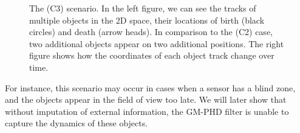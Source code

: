 \begin{figure}
\begin{subfigure}[]{0.48\linewidth}
\begin{subfigure}[b]{\linewidth}
        \end{subfigure}
    \end{subfigure}
  \caption[True tracks of objects in the (C3) and (C4) scenarios.]{The (C3) scenario. In the left figure, we can see the tracks of multiple objects in the 2D space, their locations of birth (black circles) and death (arrow heads). In comparison to the (C2) case, two additional objects appear on two additional positions. The right figure shows how the coordinates of each object track change over time.}
  \label{fig:c3-scenario}
\end{figure}

For instance, this scenario may occur in cases when a sensor has a blind zone, and the objects appear in the field of view too late. We will later show that without imputation of external information, the GM-PHD filter is unable to capture the dynamics of these objects.
